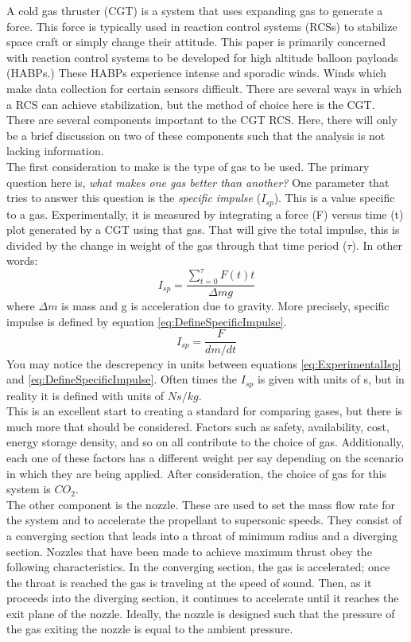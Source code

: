 A cold gas thruster (CGT) is a system that uses expanding gas to generate a force. This force is typically used in reaction control systems (RCSs) to stabilize space craft or simply change their attitude. This paper is primarily concerned with reaction control systems to be developed for high altitude balloon payloads (HABPs.) These HABPs experience intense and sporadic winds. Winds which make data collection for certain sensors difficult. There are several ways in which a RCS can achieve stabilization, but the method of choice here is the CGT.\\
There are several components important to the CGT RCS. Here, there will only be a brief discussion on two of these components such that the analysis is not lacking information. \\
The first consideration to make is the type of gas to be used. The primary question here is, \textit{what makes one gas better than another?} One parameter that tries to answer this question is the \textit{specific impulse} ($I_{sp}$). This is a value specific to a gas. Experimentally, it is measured by integrating a force (F) versus time (t) plot generated by a CGT using that gas. That will give the total impulse, this is divided by the change in weight of the gas through that time period ($\tau$). In other words:
\begin{equation}\label{eq:ExperimentalIsp}
I_{sp}=\frac{\sum\limits_{t=0}^{\tau} F(t)t}{\Delta mg}
\end{equation}
where $\Delta m$ is mass and g is acceleration due to gravity. More precisely, specific impulse is defined by  equation \ref{eq:DefineSpecificImpulse}.
\begin{equation}\label{eq:DefineSpecificImpulse}
I_{sp}=\frac{F}{dm/dt}
\end{equation}
You may notice the descrepency in units between equations \ref{eq:ExperimentalIsp} and \ref{eq:DefineSpecificImpulse}. Often times the $I_{sp}$ is given with units of s, but in reality it is defined with units of $Ns/kg$.\\
This is an excellent start to creating a standard for comparing gases, but there is much more that should be considered. Factors such as safety, availability, cost, energy storage density, and so on all contribute to the choice of gas. Additionally, each one of these factors has a different weight per say depending on the scenario in which they are being applied. After consideration, the choice of gas for this system is $CO_2$.\\
The other component is the nozzle. These are used to set the mass flow rate for the system and to accelerate the propellant to supersonic speeds. They consist of a converging section that leads into a throat of minimum radius and a diverging section. Nozzles that have been made to achieve maximum thrust obey the following characteristics. In the converging section, the gas is accelerated; once the throat is reached the gas is traveling at the speed of sound. Then, as it proceeds into the diverging section, it continues to accelerate until it reaches the exit plane of the nozzle. Ideally, the nozzle is designed such that the pressure of the gas exiting the nozzle is equal to the ambient pressure. \\

